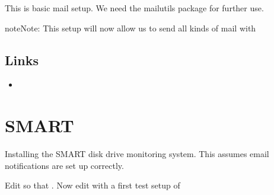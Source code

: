 \documentclass[a4paper,10pt,english]{sphinxmanual}
\begin{document}
This is basic mail setup. We need the mailutils package for further use.

\begin{sphinxVerbatim}[commandchars=\\\{\}]
   
\end{sphinxVerbatim}

\begin{sphinxadmonition}{note}{Note:}
This setup will now allow us to send all kinds of mail with

\begin{sphinxVerbatim}[commandchars=\\\{\}]
   
 
\end{sphinxVerbatim}
\end{sphinxadmonition}


\section{Links}
\label{\detokenize{mail:links}}\begin{itemize}
\item {} 

\end{itemize}


\chapter{SMART}
\label{\detokenize{smart:smart}}\label{\detokenize{smart::doc}}
Installing the SMART disk drive monitoring system. This assumes email
notifications are set up correctly.

\begin{sphinxVerbatim}[commandchars=\\\{\}]
   
\end{sphinxVerbatim}

Edit  so that . Now edit
 with a first test setup of
\end{document}
